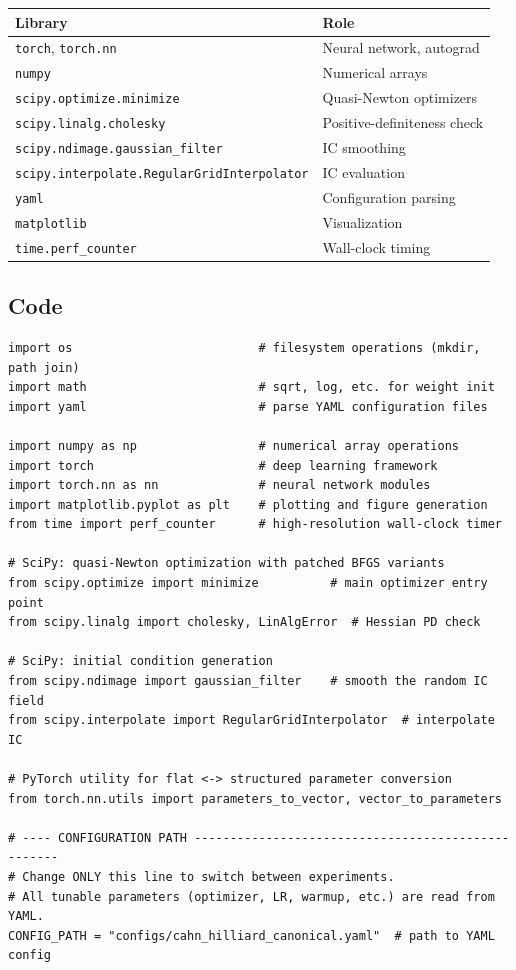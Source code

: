 \documentclass[11pt,a4paper]{article}
\begin{document}
\begin{center}
\renewcommand{\arraystretch}{1.3}
\begin{tabular}{@{}ll@{}}
\toprule
\textbf{Library} & \textbf{Role} \\
\midrule
\texttt{torch}, \texttt{torch.nn}  & Neural network, autograd \\
\texttt{numpy}                      & Numerical arrays \\
\texttt{scipy.optimize.minimize}    & Quasi-Newton optimizers \\
\texttt{scipy.linalg.cholesky}      & Positive-definiteness check \\
\texttt{scipy.ndimage.gaussian\_filter} & IC smoothing \\
\texttt{scipy.interpolate.RegularGridInterpolator} & IC evaluation \\
\texttt{yaml}                       & Configuration parsing \\
\texttt{matplotlib}                 & Visualization \\
\texttt{time.perf\_counter}         & Wall-clock timing \\
\bottomrule
\end{tabular}
\end{center}

\subsection*{Code}

\begin{lstlisting}
import os                          # filesystem operations (mkdir, path join)
import math                        # sqrt, log, etc. for weight init
import yaml                        # parse YAML configuration files

import numpy as np                 # numerical array operations
import torch                       # deep learning framework
import torch.nn as nn              # neural network modules
import matplotlib.pyplot as plt    # plotting and figure generation
from time import perf_counter      # high-resolution wall-clock timer

# SciPy: quasi-Newton optimization with patched BFGS variants
from scipy.optimize import minimize          # main optimizer entry point
from scipy.linalg import cholesky, LinAlgError  # Hessian PD check

# SciPy: initial condition generation
from scipy.ndimage import gaussian_filter    # smooth the random IC field
from scipy.interpolate import RegularGridInterpolator  # interpolate IC

# PyTorch utility for flat <-> structured parameter conversion
from torch.nn.utils import parameters_to_vector, vector_to_parameters

# ---- CONFIGURATION PATH ---------------------------------------------------
# Change ONLY this line to switch between experiments.
# All tunable parameters (optimizer, LR, warmup, etc.) are read from YAML.
CONFIG_PATH = "configs/cahn_hilliard_canonical.yaml"  # path to YAML config
\end{lstlisting}
\end{document}
